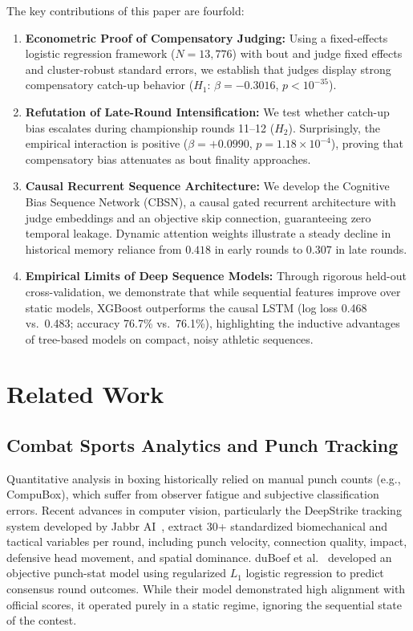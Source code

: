 \documentclass[conference]{IEEEtran}
\begin{document}
The key contributions of this paper are fourfold:
\begin{enumerate}
    \item \textbf{Econometric Proof of Compensatory Judging:} Using a fixed-effects logistic regression framework ($N = 13,776$) with bout and judge fixed effects and cluster-robust standard errors, we establish that judges display strong compensatory catch-up behavior ($H_1$: $\beta = -0.3016$, $p < 10^{-35}$).
    \item \textbf{Refutation of Late-Round Intensification:} We test whether catch-up bias escalates during championship rounds 11--12 ($H_2$). Surprisingly, the empirical interaction is positive ($\beta = +0.0990$, $p = 1.18 \times 10^{-4}$), proving that compensatory bias attenuates as bout finality approaches.
    \item \textbf{Causal Recurrent Sequence Architecture:} We develop the Cognitive Bias Sequence Network (CBSN), a causal gated recurrent architecture with judge embeddings and an objective skip connection, guaranteeing zero temporal leakage. Dynamic attention weights illustrate a steady decline in historical memory reliance from $0.418$ in early rounds to $0.307$ in late rounds.
    \item \textbf{Empirical Limits of Deep Sequence Models:} Through rigorous held-out cross-validation, we demonstrate that while sequential features improve over static models, XGBoost outperforms the causal LSTM (log loss 0.468 vs.\ 0.483; accuracy 76.7\% vs.\ 76.1\%), highlighting the inductive advantages of tree-based models on compact, noisy athletic sequences.
\end{enumerate}

\section{Related Work}
\subsection{Combat Sports Analytics and Punch Tracking}
Quantitative analysis in boxing historically relied on manual punch counts (e.g., CompuBox), which suffer from observer fatigue and subjective classification errors. Recent advances in computer vision, particularly the DeepStrike tracking system developed by Jabbr AI~\cite{jabbr2023}, extract 30+ standardized biomechanical and tactical variables per round, including punch velocity, connection quality, impact, defensive head movement, and spatial dominance. duBoef et al.~\cite{duboef2021} developed an objective punch-stat model using regularized $L_1$ logistic regression to predict consensus round outcomes. While their model demonstrated high alignment with official scores, it operated purely in a static regime, ignoring the sequential state of the contest.
\end{document}

